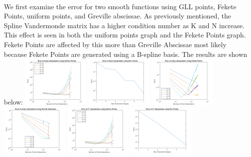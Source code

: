 \documentclass{article}
\begin{document}
\paragraph{}
We first examine the error for two smooth functions using GLL points, Fekete Points, uniform points, and Greville abscissae. As previously mentioned, the Spline Vandermonde matrix has a higher condition number as K and N increase. This effect is seen in both the uniform points graph and the Fekete Points graph. Fekete Points are affected by this more than Greville Abscissae most likely because Fekete Points are generated using a B-spline basis. The results are shown below:
\newline\hspace*{-0.5cm}
\includegraphics[height = 2.5cm]{SinUniform.png} \includegraphics[height = 2.5cm]{SinGLL.png}
\includegraphics[height = 2.5cm]{SinFekete.png} \includegraphics[height = 2.5cm]{SinGreville.png}
\hspace*{-0.5cm}\includegraphics[height = 2.5cm]{ExpUniform.png} \includegraphics[height = 2.5cm]{ExpGLL.png}
\end{document}
